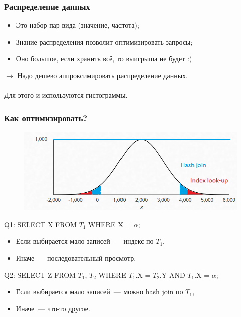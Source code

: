 \documentclass{beamer}
\begin{document}
% 

\begin{frame}
\frametitle{Распределение данных}

\begin{itemize}
  \setlength\itemsep{1em}
  \item Это набор пар вида (значение, частота);
  \item Знание распределения позволит оптимизировать запросы;
  \item Оно большое, если хранить всё, то выигрыша не будет :(
\end{itemize}

$\longrightarrow$ Надо \alert{дешево} аппроксимировать распределение данных.\\~\\

Для этого и используются гистограммы.

\end{frame}

\begin{frame}
\frametitle{Как оптимизировать?}

\begin{figure}[htb]
\includegraphics[width=\textwidth,height=0.39\textheight,keepaspectratio]{normal1.png} 
\end{figure}

Q1: SELECT X FROM $T_1$ WHERE X = $\alpha$;

\begin{itemize}
  \item Если выбирается мало записей~--- индекс по $T_1$, 
  \item Иначе~--- последовательный просмотр.
\end{itemize}

Q2: SELECT Z FROM $T_1$, $T_2$ WHERE $T_1$.X = $T_2$.Y AND $T_1$.X = $\alpha$;

\begin{itemize}
  \item Если выбирается мало записей~--- можно hash join по $T_1$, 
  \item Иначе~--- что-то другое.
\end{itemize}

\end{frame}
\end{document}
